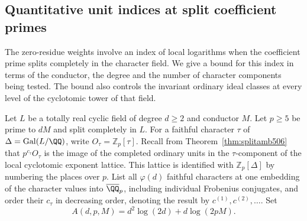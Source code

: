 \documentclass[a4paper,11pt]{article}
\theoremstyle{definition}
\theoremstyle{remark}
\newcommand{\ZZ}{\mathbb Z}\newcommand{\ord}{\operatorname{ord}}
\numberwithin{equation}{section}
\begin{document}
\subsection{Quantitative unit indices at split coefficient primes}
\label{sec:gaudronsplit646}

The zero-residue weights involve an index of local logarithms
when the coefficient prime splits completely in the character
field. We give a bound for this index in terms of the conductor,
the degree and the number of character components being tested.
The bound also controls the invariant ordinary ideal classes
at every level of the cyclotomic tower of that field.

Let \(L\) be a totally real cyclic field of degree \(d\ge2\)
and conductor \(M\). Let \(p\ge5\) be prime to \(dM\) and split
completely in \(L\). For a faithful character \(\tau\) of
\(\Delta=\operatorname{Gal}(L/\QQ)\), write
\(O_\tau=\ZZ_p[\tau]\). Recall from
Theorem~\ref{thm:splitamb506} that \(p^{c_\tau}O_\tau\) is
the image of the completed ordinary units in the
\(\tau\)-component of the local cyclotomic exponent lattice.
This lattice is identified with \(\ZZ_p[\Delta]\) by numbering
the places over \(p\). List all \(\varphi(d)\) faithful
characters at one embedding of the character values into
\(\overline{\QQ}_p\), including individual Frobenius conjugates,
and order their \(c_\tau\) in decreasing order, denoting the
result by \(c^{(1)},c^{(2)},\ldots\). Set
\[
             A(d,p,M)=d^2\log(2d)+d\log(2pM).
\]
\end{document}
